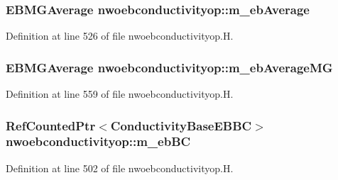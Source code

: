 \subsubsection[{\texorpdfstring{m\+\_\+eb\+Average}{m_ebAverage}}]{\setlength{\rightskip}{0pt plus 5cm}E\+B\+M\+G\+Average nwoebconductivityop\+::m\+\_\+eb\+Average\hspace{0.3cm}{\ttfamily [protected]}}\hypertarget{classnwoebconductivityop_aa352035eb2d083feabc108039bdb1eea}{}\label{classnwoebconductivityop_aa352035eb2d083feabc108039bdb1eea}


Definition at line 526 of file nwoebconductivityop.\+H.

\subsubsection[{\texorpdfstring{m\+\_\+eb\+Average\+MG}{m_ebAverageMG}}]{\setlength{\rightskip}{0pt plus 5cm}E\+B\+M\+G\+Average nwoebconductivityop\+::m\+\_\+eb\+Average\+MG\hspace{0.3cm}{\ttfamily [protected]}}\hypertarget{classnwoebconductivityop_a5b26a9a319f1c172d43c45da8270cb1f}{}\label{classnwoebconductivityop_a5b26a9a319f1c172d43c45da8270cb1f}


Definition at line 559 of file nwoebconductivityop.\+H.

\subsubsection[{\texorpdfstring{m\+\_\+eb\+BC}{m_ebBC}}]{\setlength{\rightskip}{0pt plus 5cm}Ref\+Counted\+Ptr$<$Conductivity\+Base\+E\+B\+BC$>$ nwoebconductivityop\+::m\+\_\+eb\+BC\hspace{0.3cm}{\ttfamily [protected]}}\hypertarget{classnwoebconductivityop_af44b8cada394c01a5b73c0890559e521}{}\label{classnwoebconductivityop_af44b8cada394c01a5b73c0890559e521}


Definition at line 502 of file nwoebconductivityop.\+H.

